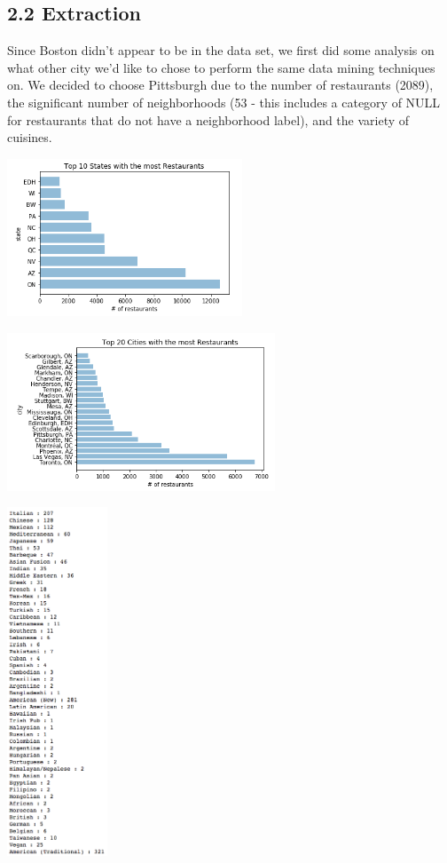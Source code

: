 \documentclass{neu_handout}
\begin{document}
\subsection*{2.2 Extraction}

Since Boston didn't appear to be in the data set, we first did some analysis on what other city we'd like to chose to perform the same data mining techniques on. We decided to choose Pittsburgh due to the number of restaurants (2089), the significant number of neighborhoods (53 - this includes a category of NULL for restaurants that do not have a neighborhood label), and the variety of cuisines.

\begin{center}
\includegraphics[width=70mm,scale=0.5]{states}\\
\end{center}

\begin{center}
\includegraphics[width=80mm,scale=0.5]{cities}\\
\end{center}

\begin{center}
\includegraphics[width=30mm,scale=0.5]{cuisines}\\
\end{center}
\end{document}
